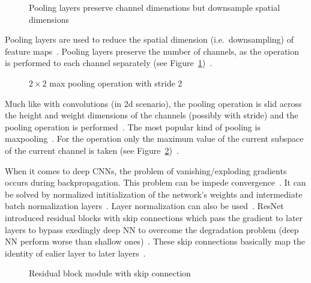 \begin{figure}[h]
    \centering
    \caption[Channel dimension preserving of pooling layers]{%
        Pooling layers preserve channel dimenstions but downsample spatial
        dimensions\label{fig:pool-layer}
    }
\end{figure}
Pooling layers are used to reduce the spatial dimension (i.e.\ downsampling) of feature
maps~\citep{ponti_everything_2017}.
Pooling layers preserve the number of channels, as the operation is performed to each channel
separately (see Figure~\ref{fig:pool-layer})~\citep{chauhan_review_2018}.
\begin{figure}[ht]
    \centering
    \caption[Visualization of a max pooling operation]{%
        $2\times 2$ max pooling operation with stride
        2~\citep{chauhan_review_2018}\label{fig:maxpool}
    }
\end{figure}
Much like with convolutions (in 2d scenario), the pooling operation is slid across the height and
weight dimensions of the channels (possibly with stride) and the pooling operation is
performed~\citep{ponti_everything_2017,chauhan_review_2018}.
The most popular kind of pooling is maxpooling~\citep{ponti_everything_2017}.
For the operation only the maximum value of the current subspace of the current channel is
taken (see Figure~\ref{fig:maxpool})~\citep{chauhan_review_2018}.

When it comes to deep \acp{CNN}, the problem of vanishing/exploding gradients occurs during
backpropagation.
This problem can be impede convergence~\citep{he_deep_2015}.
It can be solved by normalized intitialization of the network's weights and intermediate
batch normalization layers~\citep{he_deep_2015,bjorck_understanding_2018}.
Layer normalization can also be used~\citep{liu_rethinking_2021,ba_layer_2016}.
ResNet introduced residual blocks with skip connections which pass the gradient to later layers
to bypass exedingly deep \ac{NN} to overcome the degradation problem (deep \ac{NN} perform
worse than shallow ones)~\citep{he_deep_2015}.
These skip connections basically map the identity of ealier layer to later
layers~\citep{he_deep_2015}.
\begin{figure}[ht]
    \centering
    \caption[Skip connection introduced by residual blocks]{%
        Residual block module with skip
        connection~\citep{he_deep_2015}\label{fig:skip-conn}
    }
\end{figure}

